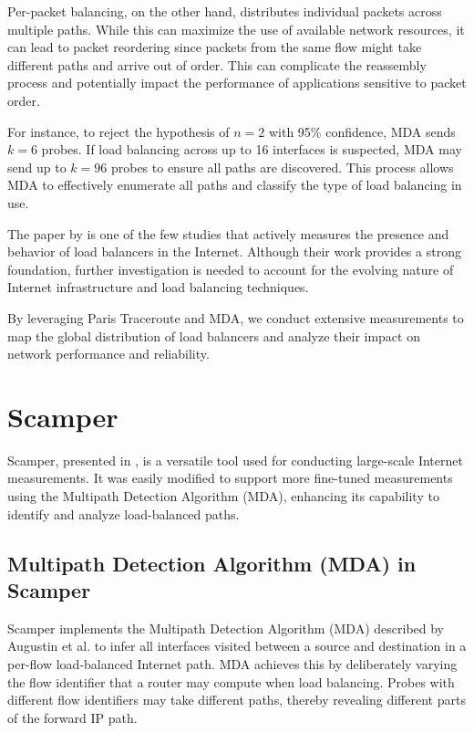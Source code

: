 \documentclass[12pt]{cwru_thesis}
\begin{document}
Per-packet balancing, on the other hand, distributes individual packets across multiple paths. While this can maximize the use of available network resources, it can lead to packet reordering since packets from the same flow might take different paths and arrive out of order. This can complicate the reassembly process and potentially impact the performance of applications sensitive to packet order.


For instance, to reject the hypothesis of \(n = 2\) with 95\% confidence, MDA sends \(k = 6\) probes. If load balancing across up to 16 interfaces is suspected, MDA may send up to \(k = 96\) probes to ensure all paths are discovered. This process allows MDA to effectively enumerate all paths and classify the type of load balancing in use.


The paper by  \cite{4261334} is one of the few studies that actively measures the presence and behavior of load balancers in the Internet. Although their work provides a strong foundation, further investigation is needed to account for the evolving nature of Internet infrastructure and load balancing techniques.

By leveraging Paris Traceroute and MDA, we conduct extensive measurements to map the global distribution of load balancers and analyze their impact on network performance and reliability.


\section{Scamper}

Scamper, presented in  \cite{luckie2010scamper}, is a versatile tool used for conducting large-scale Internet measurements. It was easily modified to support more fine-tuned measurements using the Multipath Detection Algorithm (MDA), enhancing its capability to identify and analyze load-balanced paths.



\subsection{Multipath Detection Algorithm (MDA) in Scamper}

Scamper implements the Multipath Detection Algorithm (MDA) described by Augustin et al. to infer all interfaces visited between a source and destination in a per-flow load-balanced Internet path. MDA achieves this by deliberately varying the flow identifier that a router may compute when load balancing. Probes with different flow identifiers may take different paths, thereby revealing different parts of the forward IP path.
\end{document}
